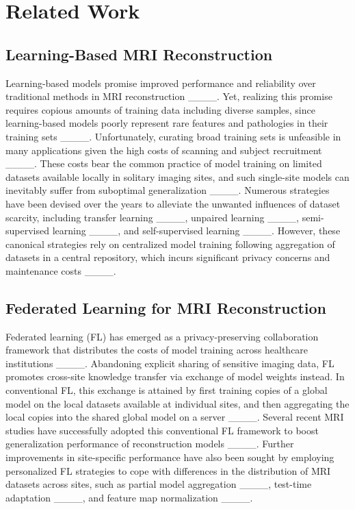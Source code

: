 \section{Related Work}
\subsection{Learning-Based MRI Reconstruction}
Learning-based models promise improved performance and reliability over traditional methods in MRI reconstruction ____. Yet, realizing this promise requires copious amounts of training data including diverse samples, since learning-based models poorly represent rare features and pathologies in their training sets ____. Unfortunately, curating broad training sets is unfeasible in many applications given the high costs of scanning and subject recruitment ____. These costs bear the common practice of model training on limited datasets available locally in solitary imaging sites, and such single-site models can inevitably suffer from suboptimal generalization ____. Numerous strategies have been devised over the years to alleviate the unwanted influences of dataset scarcity, including transfer learning ____, unpaired learning ____, semi-supervised learning ____, and self-supervised learning ____. However, these canonical strategies rely on centralized model training following aggregation of datasets in a central repository, which incurs significant privacy concerns and maintenance costs ____.

\subsection{Federated Learning for MRI Reconstruction}
Federated learning (FL) has emerged as a privacy-preserving collaboration framework that distributes the costs of model training across healthcare institutions ____. Abandoning explicit sharing of sensitive imaging data, FL promotes cross-site knowledge transfer via exchange of model weights instead. In conventional FL, this exchange is attained by first training copies of a global model on the local datasets available at individual sites, and then aggregating the local copies into the shared global model on a server ____. Several recent MRI studies have successfully adopted this conventional FL framework to boost generalization performance of reconstruction models ____. Further improvements in site-specific performance have also been sought by employing personalized FL strategies to cope with differences in the distribution of MRI datasets across sites, such as partial model aggregation ____, test-time adaptation ____, and feature map normalization ____. 

